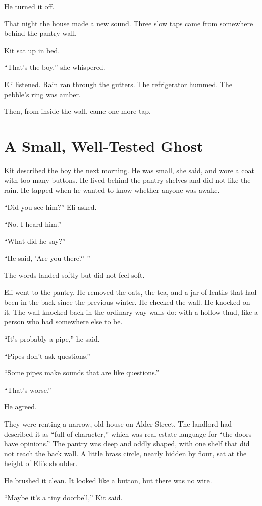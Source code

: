\documentclass[11pt,openany]{book}
\begin{document}
He turned it off.

That night the house made a new sound. Three slow taps came from somewhere behind the pantry wall.

Kit sat up in bed.

``That's the boy,'' she whispered.

Eli listened. Rain ran through the gutters. The refrigerator hummed. The pebble's ring was amber.

Then, from inside the wall, came one more tap.

\chapter{A Small, Well-Tested Ghost}

Kit described the boy the next morning. He was small, she said, and wore a coat with too many buttons. He lived behind the pantry shelves and did not like the rain. He tapped when he wanted to know whether anyone was awake.

``Did you see him?'' Eli asked.

``No. I heard him.''

``What did he say?''

``He said, 'Are you there?' ''

The words landed softly but did not feel soft.

Eli went to the pantry. He removed the oats, the tea, and a jar of lentils that had been in the back since the previous winter. He checked the wall. He knocked on it. The wall knocked back in the ordinary way walls do: with a hollow thud, like a person who had somewhere else to be.

``It's probably a pipe,'' he said.

``Pipes don't ask questions.''

``Some pipes make sounds that are like questions.''

``That's worse.''

He agreed.

They were renting a narrow, old house on Alder Street. The landlord had described it as ``full of character,'' which was real-estate language for ``the doors have opinions.'' The pantry was deep and oddly shaped, with one shelf that did not reach the back wall. A little brass circle, nearly hidden by flour, sat at the height of Eli's shoulder.

He brushed it clean. It looked like a button, but there was no wire.

``Maybe it's a tiny doorbell,'' Kit said.
\end{document}
